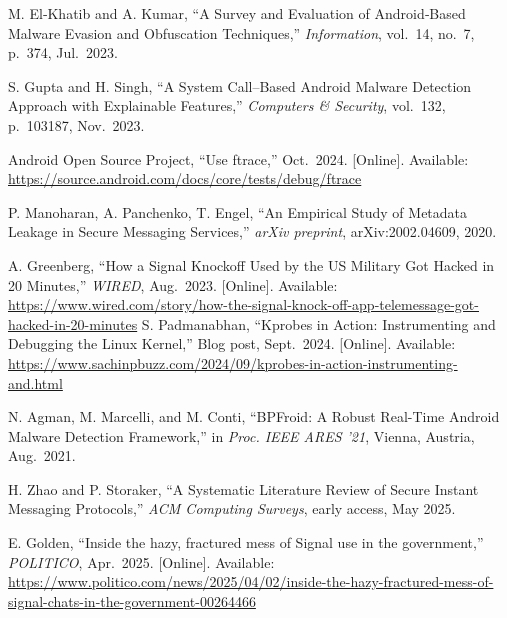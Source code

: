 \documentclass[a4paper,12pt]{report}
\begin{document}
\begin{thebibliography}{99}
M. El‐Khatib and A. Kumar, “A Survey and Evaluation of Android‐Based Malware Evasion and Obfuscation Techniques,” \emph{Information}, vol.\ 14, no.\ 7, p.~374, Jul.\ 2023.

S. Gupta and H. Singh, “A System Call–Based Android Malware Detection Approach with Explainable Features,” \emph{Computers \& Security}, vol.\ 132, p.~103187, Nov.\ 2023.

Android Open Source Project, “Use ftrace,” Oct.\ 2024.  [Online]. Available: \url{https://source.android.com/docs/core/tests/debug/ftrace}

P. Manoharan, A. Panchenko, T. Engel,
``An Empirical Study of Metadata Leakage in Secure Messaging Services,''
\emph{arXiv preprint}, arXiv:2002.04609, 2020.

A. Greenberg,
``How a Signal Knockoff Used by the US Military Got Hacked in 20 Minutes,''
\emph{WIRED}, Aug.\ 2023.
[Online]. Available: \url{https://www.wired.com/story/how-the-signal-knock-off-app-telemessage-got-hacked-in-20-minutes}
S. Padmanabhan, “Kprobes in Action: Instrumenting and Debugging the Linux Kernel,” Blog post, Sept.\ 2024.  [Online]. Available: \url{https://www.sachinpbuzz.com/2024/09/kprobes-in-action-instrumenting-and.html}

N. Agman, M. Marcelli, and M. Conti, “BPFroid: A Robust Real-Time Android Malware Detection Framework,” in \emph{Proc. IEEE ARES ’21}, Vienna, Austria, Aug.\ 2021.

H. Zhao and P. Storaker, “A Systematic Literature Review of Secure Instant Messaging Protocols,” \emph{ACM Computing Surveys}, early access, May 2025.

E. Golden, “Inside the hazy, fractured mess of Signal use in the government,” \emph{POLITICO}, Apr.\ 2025.  [Online]. Available: \url{https://www.politico.com/news/2025/04/02/inside-the-hazy-fractured-mess-of-signal-chats-in-the-government-00264466}


\end{thebibliography}
\end{document}
